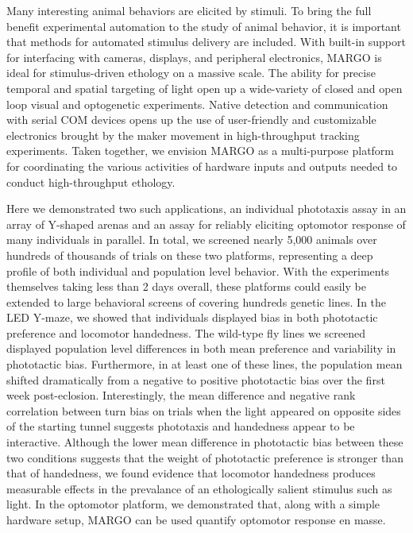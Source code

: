 \documentclass[10pt]{article}
\begin{document}
\begin{multicols}{2}
Many interesting animal behaviors are elicited by stimuli. To bring the full benefit experimental automation to the study of animal behavior, it is important that methods for automated stimulus delivery are included. With built-in support for interfacing with cameras, displays, and peripheral electronics, MARGO is ideal for stimulus-driven ethology on a massive scale. The ability for precise temporal and spatial targeting of light open up a wide-variety of closed and open loop visual and optogenetic experiments. Native detection and communication with serial COM devices opens up the use of user-friendly and customizable electronics brought by the maker movement in high-throughput tracking experiments. Taken together, we envision MARGO as a multi-purpose platform for coordinating the various activities of hardware inputs and outputs needed to conduct high-throughput ethology. 

Here we demonstrated two such applications, an individual phototaxis assay in an array of Y-shaped arenas and an assay for reliably eliciting optomotor response of many individuals in parallel. In total, we screened nearly 5,000 animals over hundreds of thousands of trials on these two platforms, representing a deep profile of both individual and population level behavior. With the experiments themselves taking less than 2 days overall, these platforms could easily be extended to large behavioral screens of covering hundreds genetic lines. In the LED Y-maze, we showed that individuals displayed bias in both phototactic preference and locomotor handedness. The wild-type fly lines we screened displayed population level differences in both mean preference and variability in phototactic bias. Furthermore, in at least one of these lines, the population mean shifted dramatically from a negative to positive phototactic bias over the first week post-eclosion. Interestingly, the mean difference and negative rank correlation between turn bias on trials when the light appeared on opposite sides of the starting tunnel suggests phototaxis and handedness appear to be interactive. Although the lower mean difference in phototactic bias between these two conditions suggests that the weight of phototactic preference is stronger than that of handedness, we found evidence that locomotor handedness produces measurable effects in the prevalance of an ethologically salient stimulus such as light. In the optomotor platform, we demonstrated that, along with a simple hardware setup, MARGO can be used quantify optomotor response en masse.


\end{multicols}
\end{document}
